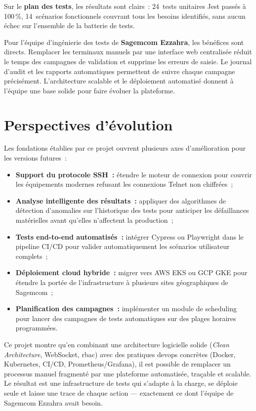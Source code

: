 Sur le \textbf{plan des tests}, les résultats sont clairs~: 24~tests
unitaires Jest passés à 100\,\%, 14~scénarios fonctionnels couvrant
tous les besoins identifiés, sans aucun échec sur l'ensemble de la
batterie de tests.

Pour l'équipe d'ingénierie des tests de \textbf{Sagemcom Ezzahra},
les bénéfices sont directs. Remplacer les terminaux manuels par une
interface web centralisée réduit le temps des campagnes de validation
et supprime les erreurs de saisie. Le journal d'audit et les rapports
automatiques permettent de suivre chaque campagne précisément.
L'architecture scalable et le déploiement automatisé donnent à l'équipe
une base solide pour faire évoluer la plateforme.

\section*{Perspectives d'évolution}

Les fondations établies par ce projet ouvrent plusieurs axes
d'amélioration pour les versions futures~:

\begin{itemize}
  \item \textbf{Support du protocole SSH~:} étendre le moteur de
        connexion pour couvrir les équipements modernes refusant
        les connexions Telnet non chiffrées~;

  \item \textbf{Analyse intelligente des résultats~:} appliquer
        des algorithmes de détection d'anomalies sur l'historique
        des tests pour anticiper les défaillances matérielles avant
        qu'elles n'affectent la production~;

  \item \textbf{Tests end-to-end automatisés~:} intégrer Cypress
        ou Playwright dans le pipeline CI/CD pour valider
        automatiquement les scénarios utilisateur complets~;

  \item \textbf{Déploiement cloud hybride~:} migrer vers AWS EKS
        ou GCP GKE pour étendre la portée de l'infrastructure à
        plusieurs sites géographiques de Sagemcom~;

  \item \textbf{Planification des campagnes~:} implémenter un
        module de scheduling pour lancer des campagnes de tests
        automatiques sur des plages horaires programmées.
\end{itemize}

\vspace{0.5cm}
\noindent Ce projet montre qu'en combinant une architecture logicielle
solide (\textit{Clean Architecture}, WebSocket, \gls{rbac}) avec des
pratiques \gls{devops} concrètes (Docker, Kubernetes, CI/CD,
Prometheus/Grafana), il est possible de remplacer un processus manuel
fragmenté par une plateforme automatisée, traçable et scalable. Le
résultat est une infrastructure de tests qui s'adapte à la charge, se
déploie seule et laisse une trace de chaque action --- exactement ce
dont l'équipe de Sagemcom Ezzahra avait besoin.
